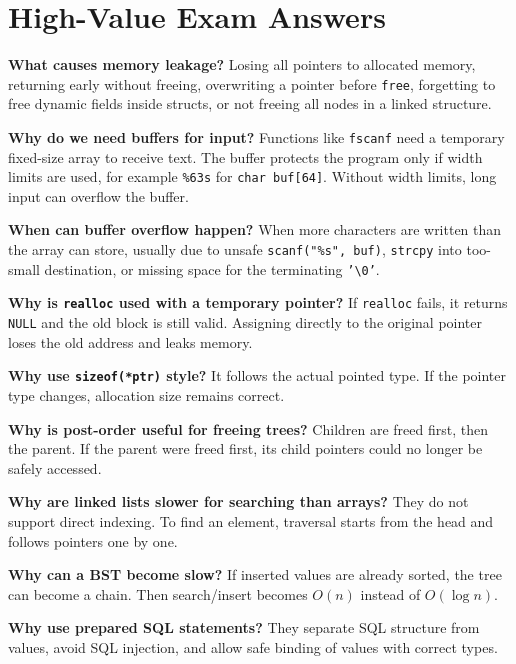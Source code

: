 \documentclass[9pt,a4paper]{article}
\newcommand{\code}[1]{\texttt{#1}}
\begin{document}
\section{High-Value Exam Answers}
\begin{exam}
\textbf{What causes memory leakage?} Losing all pointers to allocated memory, returning early without freeing, overwriting a pointer before \code{free}, forgetting to free dynamic fields inside structs, or not freeing all nodes in a linked structure.\par
\textbf{Why do we need buffers for input?} Functions like \code{fscanf} need a temporary fixed-size array to receive text. The buffer protects the program only if width limits are used, for example \code{\%63s} for \code{char buf[64]}. Without width limits, long input can overflow the buffer.\par
\textbf{When can buffer overflow happen?} When more characters are written than the array can store, usually due to unsafe \code{scanf("\%s", buf)}, \code{strcpy} into too-small destination, or missing space for the terminating \code{'\textbackslash0'}.\par
\textbf{Why is \code{realloc} used with a temporary pointer?} If \code{realloc} fails, it returns \code{NULL} and the old block is still valid. Assigning directly to the original pointer loses the old address and leaks memory.\par
\textbf{Why use \code{sizeof(*ptr)} style?} It follows the actual pointed type. If the pointer type changes, allocation size remains correct.\par
\textbf{Why is post-order useful for freeing trees?} Children are freed first, then the parent. If the parent were freed first, its child pointers could no longer be safely accessed.\par
\textbf{Why are linked lists slower for searching than arrays?} They do not support direct indexing. To find an element, traversal starts from the head and follows pointers one by one.\par
\textbf{Why can a BST become slow?} If inserted values are already sorted, the tree can become a chain. Then search/insert becomes \(O(n)\) instead of \(O(\log n)\).\par
\textbf{Why use prepared SQL statements?} They separate SQL structure from values, avoid SQL injection, and allow safe binding of values with correct types.
\end{exam}
\end{document}
